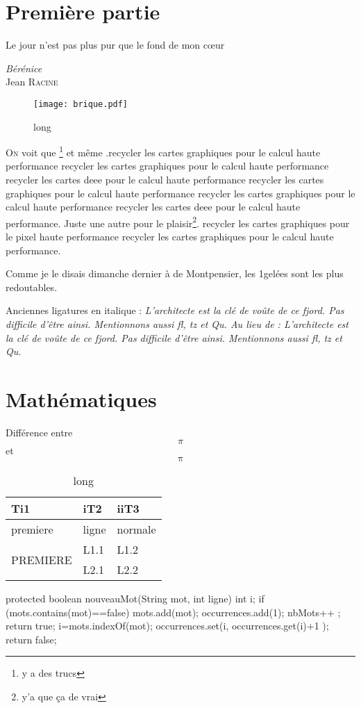 \section{Première partie}
\epigraph{Le jour n'est pas plus pur que le fond de mon cœur}{\emph{Bérénice}\\ Jean \textsc{Racine}}
\label{sec:pp}
\begin{figure}[hbtp]
\texttt{[image: brique.pdf]}
\label{fig:birque}
\caption[short]{long}
\end{figure}
\lettrine[lines=3, lhang=0.2, loversize=0.33, slope=0.0em, findent=0.0em, nindent=0.3em]{O}{n} voit que \footnote{y a des trucs} et même .recycler les cartes graphiques pour le calcul haute performance recycler les cartes graphiques pour le calcul haute performance \cite{gpgpu} recycler les cartes \gls{deee} pour le calcul haute performance recycler les cartes graphiques pour le calcul haute performance recycler les cartes graphiques pour le calcul haute performance recycler les cartes \gls{deee} pour le calcul haute performance. Juste une autre pour le plaisir\footnote{y'a que ça de vrai}. recycler les cartes graphiques pour le \gls{pixel} haute performance recycler les cartes graphiques pour le calcul haute performance. 

Comme je le disais dimanche dernier à \madame de Montpensier, les 1\ieres gelées sont les plus redoutables.

Anciennes ligatures en italique : \itshape{L'architecte est la clé de voûte de ce fjord. Pas difficile d'être ainsi. Mentionnons aussi fl, tz et Qu.} Au lieu de : L'architecte est la clé de voûte de ce fjord. Pas difficile d'être ainsi. Mentionnons aussi fl, tz et Qu.

\section{Mathématiques}
Différence entre
\[ \pi \] et 
\[ \uppi \]

\begin{table}[ht]
\centering
\begin{tabular}{|l|l|l|}
\hline
{\bfseries Ti1} & {\bfseries iT2} & {\bfseries iiT3} \tabularnewline
\hline
premiere & ligne & normale \tabularnewline
\hline
\multirow{2}{*}{PREMIERE}
& L1.1 & L1.2 \tabularnewline
& L2.1 & L2.2 \tabularnewline
\hline
\end{tabular}
\label{tab:suicide}
\caption[short]{long}
\end{table}
\vspace{1.5cm}
\label{1nm}
\begin{java}[label=1nm]
protected boolean nouveauMot(String mot, int ligne) {
	int i;
	if (mots.contains(mot)==false)	{
		mots.add(mot); 
		occurrences.add(1);
		nbMots++ ;
		return true;
	}
	i=mots.indexOf(mot);
	occurrences.set(i, occurrences.get(i)+1 );
	return false;
}
\end{java}

